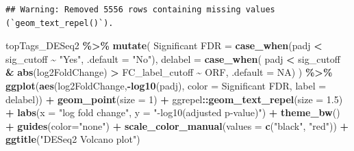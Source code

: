 \documentclass[
]{book}
\newenvironment{Shaded}{\begin{snugshade}}{\end{snugshade}}
\newcommand{\AttributeTok}[1]{\textcolor[rgb]{0.13,0.29,0.53}{#1}}
\newcommand{\ConstantTok}[1]{\textcolor[rgb]{0.56,0.35,0.01}{#1}}
\newcommand{\DecValTok}[1]{\textcolor[rgb]{0.00,0.00,0.81}{#1}}
\newcommand{\FloatTok}[1]{\textcolor[rgb]{0.00,0.00,0.81}{#1}}
\newcommand{\FunctionTok}[1]{\textcolor[rgb]{0.13,0.29,0.53}{\textbf{#1}}}
\newcommand{\NormalTok}[1]{#1}
\newcommand{\OtherTok}[1]{\textcolor[rgb]{0.56,0.35,0.01}{#1}}
\newcommand{\SpecialCharTok}[1]{\textcolor[rgb]{0.81,0.36,0.00}{\textbf{#1}}}
\newcommand{\StringTok}[1]{\textcolor[rgb]{0.31,0.60,0.02}{#1}}
\begin{document}
\begin{verbatim}
## Warning: Removed 5556 rows containing missing values (`geom_text_repel()`).
\end{verbatim}

\begin{Shaded}
\begin{Highlighting}[]
\NormalTok{topTags\_DESeq2 }\SpecialCharTok{\%\textgreater{}\%}
  \FunctionTok{mutate}\NormalTok{(}
    \StringTok{\textasciigrave{}}\AttributeTok{Significant FDR}\StringTok{\textasciigrave{}} \OtherTok{=} \FunctionTok{case\_when}\NormalTok{(padj }\SpecialCharTok{\textless{}}\NormalTok{ sig\_cutoff }\SpecialCharTok{\textasciitilde{}} \StringTok{"Yes"}\NormalTok{,}
                                  \AttributeTok{.default =} \StringTok{"No"}\NormalTok{),}
    \AttributeTok{delabel =} \FunctionTok{case\_when}\NormalTok{(}
\NormalTok{      padj }\SpecialCharTok{\textless{}}\NormalTok{ sig\_cutoff }\SpecialCharTok{\&} \FunctionTok{abs}\NormalTok{(log2FoldChange) }\SpecialCharTok{\textgreater{}}\NormalTok{ FC\_label\_cutoff }\SpecialCharTok{\textasciitilde{}}\NormalTok{ ORF,}
      \AttributeTok{.default =} \ConstantTok{NA}\NormalTok{)}
\NormalTok{  ) }\SpecialCharTok{\%\textgreater{}\%} 
  \FunctionTok{ggplot}\NormalTok{(}\FunctionTok{aes}\NormalTok{(log2FoldChange,}\SpecialCharTok{{-}}\FunctionTok{log10}\NormalTok{(padj), }\AttributeTok{color =} \StringTok{\textasciigrave{}}\AttributeTok{Significant FDR}\StringTok{\textasciigrave{}}\NormalTok{, }\AttributeTok{label =}\NormalTok{ delabel)) }\SpecialCharTok{+} 
    \FunctionTok{geom\_point}\NormalTok{(}\AttributeTok{size =} \DecValTok{1}\NormalTok{) }\SpecialCharTok{+}
\NormalTok{  ggrepel}\SpecialCharTok{::}\FunctionTok{geom\_text\_repel}\NormalTok{(}\AttributeTok{size =} \FloatTok{1.5}\NormalTok{) }\SpecialCharTok{+}
  \FunctionTok{labs}\NormalTok{(}\AttributeTok{x =} \StringTok{"log fold change"}\NormalTok{, }\AttributeTok{y =} \StringTok{"{-}log10(adjusted p{-}value)"}\NormalTok{) }\SpecialCharTok{+}
  \FunctionTok{theme\_bw}\NormalTok{() }\SpecialCharTok{+}
  \FunctionTok{guides}\NormalTok{(}\AttributeTok{color=}\StringTok{"none"}\NormalTok{) }\SpecialCharTok{+}
  \FunctionTok{scale\_color\_manual}\NormalTok{(}\AttributeTok{values =} \FunctionTok{c}\NormalTok{(}\StringTok{"black"}\NormalTok{, }\StringTok{"red"}\NormalTok{)) }\SpecialCharTok{+}
    \FunctionTok{ggtitle}\NormalTok{(}\StringTok{"DESeq2 Volcano plot"}\NormalTok{)}
\end{Highlighting}
\end{Shaded}
\end{document}
